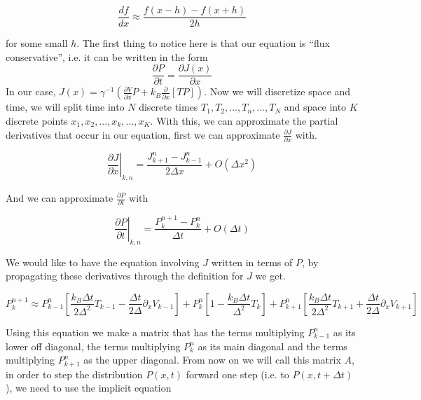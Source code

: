 \documentclass[11pt]{article} %
\begin{document}
\begin{equation}
\frac{d f}{d x} \approx \frac{f(x - h) - f(x + h)}{2h}
\end{equation}

for some small $h$. The first thing to notice here is that our equation is ``flux conservative'', i.e. it can be written in the form
$$ \frac{\partial P}{\partial t} = \frac{\partial J(x)}{\partial x} $$
In our case, $J(x) = \gamma^{-1} \left ( \frac{\partial V}{\partial x} P + k_B \frac{\partial}{\partial x} [T P] \right ) $. Now we will discretize space and time, we will split time into $N$ discrete times  $T_1, T_2, ..., T_n, ..., T_N$ and space into $K$ discrete points $x_1, x_2, ..., x_k, ..., x_K$. With this, we can approximate the partial derivatives that occur in our equation, first we can approximate $\frac{\partial J}{\partial x}$ with.

\begin{equation}
\left. \frac{\partial J}{\partial x} \right|_{k, n} = \frac{J_{k+1}^n - J_{k-1}^n}{2 \Delta x} + O(\Delta x^2)
\end{equation}

And we can approximate $\frac{\partial P}{\partial t}$ with

\begin{equation}
\left. \frac{\partial P}{\partial t} \right|_{k, n} = \frac{P_k^{n+1} - P_k^n}{\Delta t} + O(\Delta t)
\end{equation}

We would like to have the equation involving $J$ written in terms of $P$, by propagating these derivatives through the definition for $J$ we get.

\begin{equation}
P_{k}^{n+1} \approx P_{k-1}^n \left [ \frac{k_B \Delta t}{2 \Delta^2} T_{k-1} - \frac{\Delta t}{2 \Delta} \partial_x V_{k-1} \right ] +
 P_k^n \left [1 - \frac{k_B \Delta t}{\Delta^2} T_k \right] +
 P_{k+1}^n \left [ \frac{k_B \Delta t}{2 \Delta^2}T_{k+1} + \frac{\Delta t}{2 \Delta} \partial_x V_{k+1} \right]
\end{equation}

Using this equation we make a matrix that has the terms multiplying $P_{k-1}^n$ as its lower off diagonal, the terms multiplying $P_k^n$ as its main diagonal and the terms multiplying $P_{k+1}^n$ as the upper diagonal. From now on we will call this matrix $A$, in order to step the distribution $P(x, t)$ forward one step (i.e. to $P(x, t + \Delta t)$), we need to use the implicit equation
\end{document}
